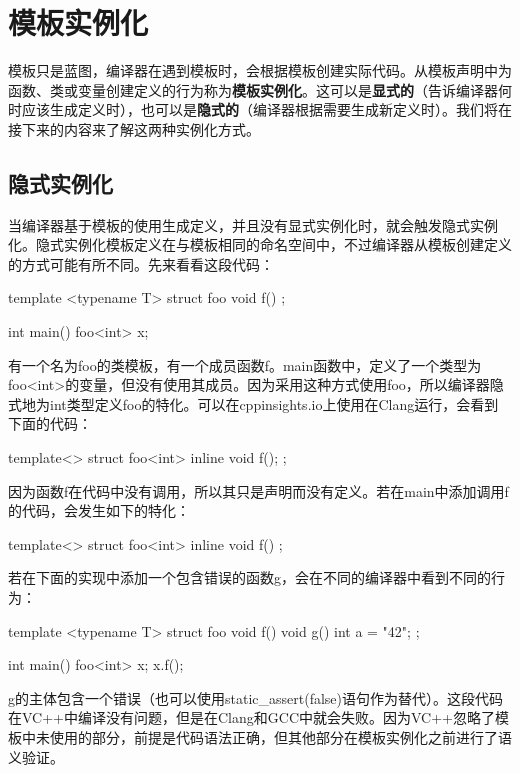\section{模板实例化}

模板只是蓝图，编译器在遇到模板时，会根据模板创建实际代码。从模板声明中为函数、类或变量创建定义的行为称为\textbf{模板实例化}。这可以是\textbf{显式的}（告诉编译器何时应该生成定义时），也可以是\textbf{隐式的}（编译器根据需要生成新定义时）。我们将在接下来的内容来了解这两种实例化方式。

\subsection{隐式实例化}

当编译器基于模板的使用生成定义，并且没有显式实例化时，就会触发隐式实例化。隐式实例化模板定义在与模板相同的命名空间中，不过编译器从模板创建定义的方式可能有所不同。先来看看这段代码：

\begin{cpp}
template <typename T>
struct foo
{
	void f() {}
};

int main()
{
	foo<int> x;
}
\end{cpp}

有一个名为foo的类模板，有一个成员函数f。main函数中，定义了一个类型为foo<int>的变量，但没有使用其成员。因为采用这种方式使用foo，所以编译器隐式地为int类型定义foo的特化。可以在cppinsights.io上使用在Clang运行，会看到下面的代码：

\begin{cpp}
template<>
struct foo<int>
{
	inline void f();
};
\end{cpp}

因为函数f在代码中没有调用，所以其只是声明而没有定义。若在main中添加调用f的代码，会发生如下的特化：

\begin{cpp}
template<>
struct foo<int>
{
	inline void f() { }
};
\end{cpp}

若在下面的实现中添加一个包含错误的函数g，会在不同的编译器中看到不同的行为：

\begin{cpp}
template <typename T>
struct foo
{
	void f() {}
	void g() {int a = "42";}
};

int main()
{
	foo<int> x;
	x.f();
}
\end{cpp}

g的主体包含一个错误（也可以使用static\_assert(false)语句作为替代）。这段代码在VC++中编译没有问题，但是在Clang和GCC中就会失败。因为VC++忽略了模板中未使用的部分，前提是代码语法正确，但其他部分在模板实例化之前进行了语义验证。


